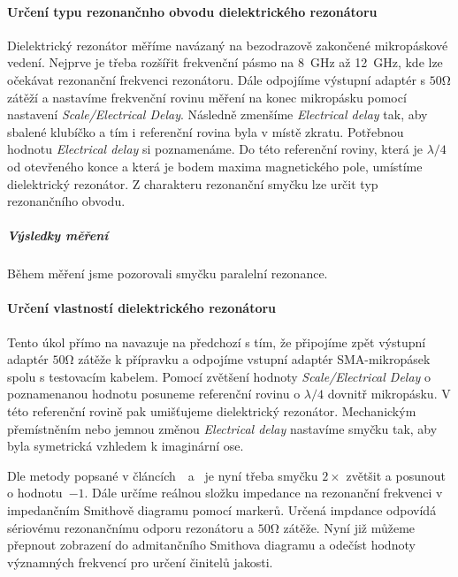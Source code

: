 \documentclass[11pt,a4paper]{article}
\newcommand{\Ohm}{\mathrm{\Omega}}
\begin{document}
\paragraph*{Určení typu rezonančnho obvodu dielektrického rezonátoru} Dielektrický rezonátor měříme navázaný na bezodrazově zakončené mikropáskové vedení. Nejprve je třeba rozšířit frekvenční pásmo na 8~GHz až 12~GHz, kde lze očekávat rezonanční frekvenci rezonátoru. Dále odpojííme výstupní adaptér s $50\Ohm$ zátěží a nastavíme frekvenční rovinu měření na konec mikropásku pomocí nastavení \emph{Scale/Electrical Delay}. Následně zmenšíme \emph{Electrical delay} tak, aby sbalené klubíčko a tím i referenční rovina byla v místě zkratu. Potřebnou hodnotu \emph{Electrical delay} si poznamenáme. Do této referenční roviny, která je $\lambda/4$ od otevřeného konce a která je bodem maxima magnetického pole, umístíme dielektrický rezonátor. Z charakteru rezonanční smyčku lze určit typ rezonančního obvodu.

\subparagraph*{Výsledky měření} Během měření jsme pozorovali smyčku paralelní rezonance.

\paragraph*{Určení vlastností dielektrického rezonátoru} Tento úkol přímo na navazuje na předchozí s tím, že připojíme zpět výstupní adaptér $50\Ohm$ zátěže k přípravku a odpojíme vstupní adaptér SMA-mikropásek spolu s testovacím kabelem. Pomocí zvětšení hodnoty \emph{Scale/Electrical Delay} o poznamenanou hodnotu posuneme referenční rovinu o $\lambda/4$ dovnitř mikropásku. V této referenční rovině pak umišťujeme dielektrický rezonátor. Mechanickým přemístněním nebo jemnou změnou \emph{Electrical delay} nastavíme smyčku tak, aby byla symetrická vzhledem k imaginární ose.

Dle metody popsané v článcích~\cite{khanna-garault:determination-of-q}~a~\cite{khanna:q-measurement-of-coupled-microstrips} je nyní třeba smyčku $2\times$ zvětšit a posunout o hodnotu~$-1$. Dále určíme reálnou složku impedance na rezonanční frekvenci v impedančním Smithově diagramu pomocí markerů. Určená impdance odpovídá sériovému rezonančnímu odporu rezonátoru a $50\Ohm$ zátěže. Nyní již můžeme přepnout zobrazení do admitančního Smithova diagramu a odečíst hodnoty významných frekvencí pro určení činitelů jakosti.
\end{document}
